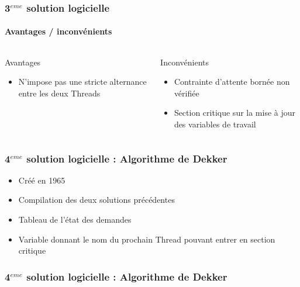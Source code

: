 \begin{frame}
\frametitle{3$^{eme}$ solution logicielle}
\framesubtitle{Avantages / inconvénients}

\begin{columns}
\begin{block}{Avantages}
\begin{itemize}
\item N’impose pas une stricte alternance entre les deux Threads
\end{itemize}
\end{block}
\begin{block}{Inconvénients}
\begin{itemize}
\item Contrainte d'attente bornée non vérifiée
\item Section critique sur la mise à jour des variables de travail
\end{itemize}
\end{block}
\end{columns}
\end{frame}

\begin{frame}
\frametitle{4$^{eme}$ solution logicielle : Algorithme de Dekker}
\begin{itemize}
\item Créé en 1965
\item Compilation des deux solutions précédentes
\item Tableau de l’état des demandes
\item Variable donnant le nom du prochain Thread pouvant entrer en section critique
\end{itemize}
\end{frame}

\begin{frame}
\frametitle{4$^{eme}$ solution logicielle : Algorithme de Dekker}
\begin{scriptsize}\end{scriptsize}
\end{frame}

